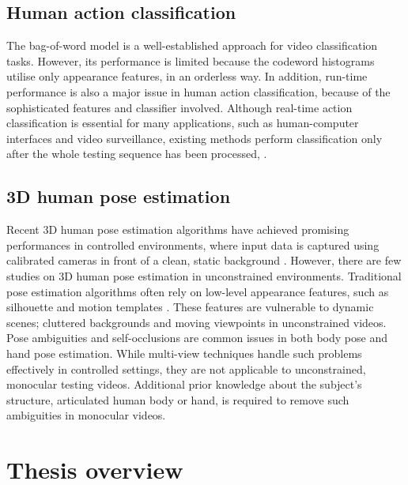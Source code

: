 \subsection{Human action classification}


The bag-of-word model is a well-established approach for video classification tasks. However, its performance is limited because the codeword histograms utilise only appearance features, in an orderless way. In addition, run-time performance is also a major issue in human action classification, because of the sophisticated features and classifier involved. Although real-time action classification is essential for many applications, such as human-computer interfaces and video surveillance, existing methods perform classification only after the whole testing sequence has been processed, \eg \cite{Schuldt2004, Dollar2005, Riemenschneider2009, Niebles2008, Wong2007}. 

\subsection{3D human pose estimation} 


Recent 3D human pose estimation algorithms have achieved promising performances in controlled environments, where input data is captured using calibrated cameras in front of a clean, static background \cite{Rogez2012, Pons-Moll2011, Sigal2012}. 
However, there are few studies on 3D human pose estimation in unconstrained environments.  
Traditional pose estimation algorithms often rely on low-level appearance features, such as silhouette and motion templates \cite{Bissacco2007, Rogez2012, Ionescu2011, Navaratnam2006}. These features are vulnerable to dynamic scenes; cluttered backgrounds and moving viewpoints in unconstrained videos. 
Pose ambiguities and self-occlusions are common issues in both body pose and hand pose estimation. While multi-view techniques handle such problems effectively in controlled settings, they are not applicable to unconstrained, monocular testing videos. Additional prior knowledge about the subject's structure, \eg articulated human body or hand, is required to remove such ambiguities in monocular videos. 

\section{Thesis overview}

